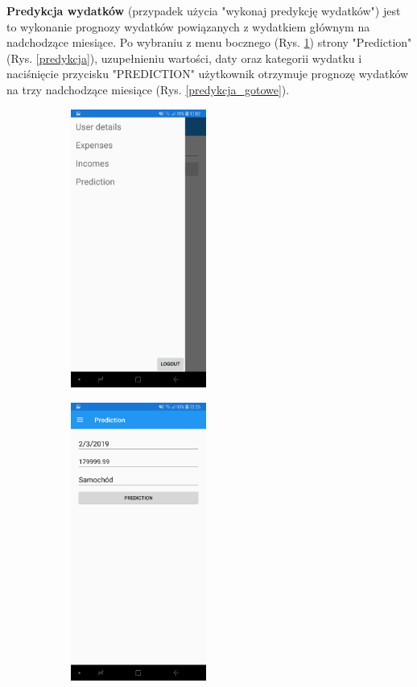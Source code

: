 \textbf{Predykcja wydatków} (przypadek użycia "wykonaj predykcję wydatków") jest to wykonanie prognozy wydatków powiązanych z wydatkiem głównym na nadchodzące miesiące. Po wybraniu z menu bocznego (Rys. \ref{hamburger_predykcja}) strony "Prediction" (Rys. \ref{predykcja}), uzupełnieniu wartości, daty oraz kategorii wydatku i naciśnięcie przycisku "PREDICTION" użytkownik otrzymuje prognozę wydatków na trzy nadchodzące miesiące (Rys. \ref{predykcja_gotowe}).
\begin{figure}[!ht]
	\begin{center}
		\begin{subfigure}[b]{0.3\textwidth}
			\includegraphics[width=1.75in]{img/mobile/menu_boczne.jpg}
			\label{hamburger_predykcja}
		\end{subfigure}
		\begin{subfigure}[b]{0.3\textwidth}
			\includegraphics[width=1.75in]{img/mobile/predykcja.jpg}

\end{subfigure}
\end{center}
\end{figure}
